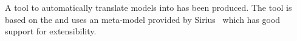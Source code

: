 
A tool to automatically translate \SCXML models into \iUMLB has been produced. 
The tool is based on the \EMF and uses an \SCXML meta-model provided by Sirius~\cite{siriuswebsite} which has good support for extensibility. 

